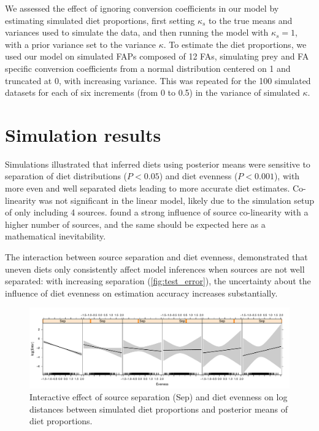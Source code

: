 \documentclass[12pt]{article}
\begin{document}
We assessed the effect of ignoring conversion coefficients in our
model by estimating simulated diet proportions, first setting
$\kappa_s$ to the true means and variances used to simulate the data,
and then running the model with $\kappa_s = 1$, with a prior variance set to the
variance $\kappa$. To estimate the diet proportions, we used our model on
simulated FAPs composed of 12 FAs, simulating prey and FA specific
conversion coefficients from a normal distribution centered on 1 and
truncated at 0,
with increasing variance. This was repeated for the 100 simulated datasets for
each of six increments (from 0 to 0.5) in the variance of simulated
$\kappa$. 

\section{Simulation results}

Simulations illustrated that inferred diets using posterior means were sensitive to
separation of diet distributions ($P<0.05$) and diet
evenness ($P<0.001$), with more even and well separated diets leading to
more accurate diet estimates. Co-linearity was not significant in the
linear model, likely due to the simulation setup of only including 4
sources. \citet{blanchard_inference_2011} found a strong influence of
source co-linearity with a higher number of sources, and the same
should be expected here as a mathematical inevitability. 

The interaction between source separation and diet evenness, demonstrated that uneven diets only
consistently affect model inferences when sources are not well
separated: with increasing separation (\autoref{fig:test_error}), the uncertainty about the
influence of diet evenness on estimation accuracy increases
substantially.

\begin{figure}
  \centering   
      \includegraphics[width=1\textwidth]{figures/test_error.pdf}  
       \caption{Interactive effect of source separation (Sep) and diet
       evenness on log distances between simulated diet
         proportions and posterior means of diet proportions.}
\label{fig:test_error}
\end{figure}
\end{document}
